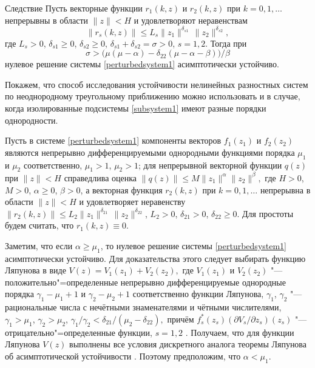 \smallskip

\begin{newthm}{Следствие} Пусть векторные функции $r_1(k, z)$  и
$r_2(k, z)$ при $k=0, 1, \ldots$ непрерывны в области $\|z\|<H$ и
удовлетворяют неравенствам $$ \|r_s(k, z)\|\leq
L_s\|z_1\|^{\delta_{s1}}\,\|z_2\|^{\delta_{s2}}, $$ где $L_s>0$,
$\delta_{s1}\geq 0$, $\delta_{s2}\geq 0$,
$\delta_{s1}+\delta_{s2}=\sigma>0$, $s=1, 2$. Тогда при
$$\sigma>\big(\mu(\mu-\alpha)-\delta_{22}(\mu-\alpha-\beta)\big)/\beta
$$
нулевое решение системы \eqref{perturbedsystem1} асимптотически
устойчиво.
\end{newthm}

\smallskip

Покажем, что способ исследования устойчивости нелинейных разностных систем по неоднородному треугольному приближению можно использовать и в случае, когда изолированные подсистемы
\eqref{subsystem1} имеют разные порядки однородности.

Пусть в системе \eqref{perturbedsystem1} компоненты векторов $f_1(z_1)$ и
$f_2(z_2)$ являются непрерывно дифференцируемыми однородными
функциями порядка $\mu_1$ и $\mu_2$ соответственно, $\mu_1>1$,
$\mu_2>1$; для непрерывной векторной функции $q(z)$ при $\|z\|<H$
справедлива оценка $\|q(z)\|\leq M\|z_1\|^{\alpha}\|z_2\|^{\beta},$ где $H>0$, $M>0$,
$\alpha\geq 0$, $\beta>0$, а векторная функция $r_2(k, z)$ при
$k=0, 1, \ldots$ непрерывна в области $\|z\|<H$ и удовлетворяет
неравенству $ \|r_2(k, z)\|\leq L_2\|z_1\|^{\delta_{21}}\,
\|z_2\|^{\delta_{22}}$, $L_2>0$, $\delta_{21}>0$, $\delta_{22}\geq
0$. Для простоты будем считать, что $r_1(k, z)\equiv0$.

Заметим, что если $\alpha\geq \mu_1$, то нулевое решение системы
\eqref{perturbedsystem1} асимптотически устойчиво. Для доказательства этого
следует выбирать функцию Ляпунова в виде
$
V(z)=V_1(z_1)+V_2(z_2),
$
где $V_1(z_1)$ и $V_2(z_2)$ "--- положительно"=определенные
непрерывно дифференцируемые однородные порядка ${\gamma_1-\mu_1+1}$
и $\gamma_2-\mu_2+1$ соответственно функции Ляпунова, $\gamma_1$,
$\gamma_2$ "--- рациональные числа с нечётными знаменателями и
чётными числителями,
$\gamma_1>\mu_1$, $\gamma_2>\mu_2$, $\gamma_1/\gamma_2<\delta_{21}/(\mu_2-\delta_{22}),$
причём $f_s^{*}(z_s)({\partial V_s}/{\partial z_s})(z_s)$ "--- отрицательно"=определенные функции, $s=1, 2$ \cite{sultan:bib4}.
Получаем, что для функции Ляпунова $V(z)$ выполнены все условия
дискретного аналога теоремы Ляпунова об асимптотической
устойчивости \cite{sultan:bib8}. Поэтому предположим, что $\alpha<\mu_1$.

